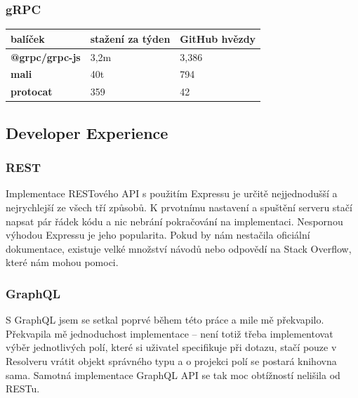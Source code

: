 \documentclass[thesis=M,czech]{FITthesis}[2019/12/23]
\begin{document}
\subsubsection*{gRPC}
\begin{table}[H]
  \begin{tabular}{|l|l|l|}
  \hline
  \textbf{balíček}                                 & \textbf{stažení za týden}                           & \textbf{GitHub hvězdy} \\ \hline
  \textbf{@grpc/grpc-js}                           & 3,2m                                                & 3,386                  \\ \hline
  \textbf{mali}                                    & 40t                                                 & 794                    \\ \hline
  \textbf{protocat}                                & 359                                                 & 42                     \\ \hline
  \end{tabular}
\end{table}

\subsection{Developer Experience}
\subsubsection*{REST}
Implementace RESTového API s použitím Expressu je určitě nejjednodušší a nejrychlejší ze všech tří způsobů. K prvotnímu nastavení a spuštění serveru stačí napsat pár řádek kódu a nic nebrání pokračování na implementaci.
Nespornou výhodou Expressu je jeho popularita. Pokud by nám nestačila oficiální dokumentace, existuje velké množství návodů nebo odpovědí na Stack Overflow, které nám mohou pomoci.

\subsubsection*{GraphQL}
S GraphQL jsem se setkal poprvé během této práce a mile mě překvapilo. Překvapila mě jednoduchost implementace -- není totiž třeba implementovat výběr jednotlivých polí, které si uživatel specifikuje při dotazu, stačí pouze v Resolveru vrátit objekt správného typu a o projekci polí se postará knihovna sama. Samotná implementace GraphQL API se tak moc obtížností nelišila od RESTu. 
\end{document}

